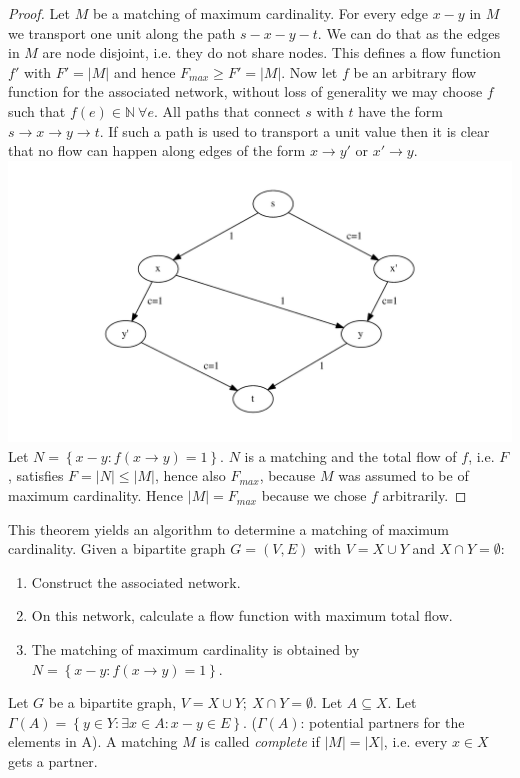 \begin{proof}
Let $M$ be a matching of maximum cardinality. For every edge $x-y$ in $M$ we transport one unit along
the path $s-x-y-t$. We can do that as the edges in $M$ are node disjoint, i.e. they do not share nodes.
This defines a flow function $f'$ with $F'=\lvert M \rvert$ and hence $F_{max}\ge F' = \lvert M \rvert$. 
Now let $f$ be an arbitrary flow function for the associated network, without loss of generality we may choose
$f$ such that $f(e)\in \mathbb{N} \: \forall e$. All paths that connect $s$ with $t$ have the form 
$s \rightarrow x \rightarrow y \rightarrow t$. If such a path is used to transport a unit value then it is clear that
no flow can happen along edges of the form $x \rightarrow y'$ or $x' \rightarrow y$.
\includegraphics[scale=0.7]{diagrams/Chapter4_Example4.pdf}\\
Let $N=\left\{x-y:f(x \rightarrow y)=1\right\}$. $N$ is a matching and the total flow of $f$, i.e. $F$, satisfies
$F=\lvert N \rvert \le \lvert M \rvert$, hence also $F_{max}$, because $M$ was assumed to be of maximum cardinality.
Hence $\lvert M \rvert=F_{max}$ because we chose $f$ arbitrarily. 
\end{proof}
This theorem yields an algorithm to determine
a matching of maximum cardinality. Given a bipartite graph $G=(V,E)$ with $V = X
\cup Y$ and $X \cap Y = \emptyset$:
\begin{enumerate}
  \item Construct the associated network.
  \item On this network, calculate a flow function with maximum total flow.
  \item The matching of maximum cardinality is obtained by $N=\left\{x - y: f(x \rightarrow y) = 1\right\}$.
\end{enumerate}
\begin{definition}
Let $G$ be a bipartite graph, $V = X \cup Y; \: X \cap Y = \emptyset$. Let $A
\subseteq X$. Let $\Gamma(A)= \left\{y \in Y: \exists x \in A: x - y \in E\right\}$. ($\Gamma(A)$: potential partners for the elements in A).
A matching $M$ is called \emph{complete} if $\lvert M \rvert = \lvert X \rvert$, i.e. every $x \in X$ gets a partner.
\end{definition}
